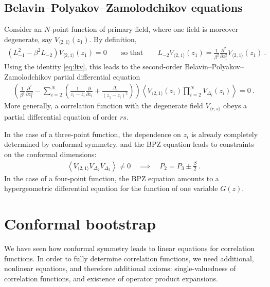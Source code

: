 \documentclass[12pt, a4paper]{article}
\theoremstyle{break}
\begin{document}
\subsection{Belavin--Polyakov--Zamolodchikov equations}

Consider an $N$-point function of primary field, where one field is moreover degenerate, say $V_{\langle 2, 1 \rangle}(z_1)$. By definition,
\begin{align}
\left(L_{-1}^2 - \beta^2 L_{-2}\right) V_{\langle 2, 1 \rangle}(z_1)  = 0\qquad \text{so that} \qquad L_{-2}V_{\langle 2, 1 \rangle}(z_1) = \frac{1}{\beta^2}\frac{\partial^2}{\partial z_1^2} V_{\langle 2, 1 \rangle}(z_1)\ .
\end{align}
Using the identity \eqref{eq:ltv},
this leads to the second-order Belavin--Polyakov--Zamolodchikov partial differential equation
\begin{align}
 \left( \frac{1}{\beta^2}\frac{\partial^2}{\partial z_1^2} - \sum_{i=2}^N\left(\frac{1}{z_1-z_i}\frac{\partial}{\partial z_i} +\frac{\Delta_i}{(z_1-z_i)^2}\right) \right)\left< V_{\langle 2, 1 \rangle}(z_1) \prod_{i=2}^N V_{\Delta_i}(z_i) \right>  = 0\ .
 \label{eq:bpz}
\end{align}
More generally, a correlation function with the degenerate field $V_{\langle r,s\rangle}$ obeys a partial differential equation of order $rs$. 

In the case of a three-point function, the dependence on $z_i$ is already completely determined by conformal symmetry, and the BPZ equation leads to constraints on the conformal dimensions:
\begin{align}
 \left< V_{\langle 2, 1 \rangle} V_{\Delta_2} V_{\Delta_3} \right> \neq 0 \quad \implies \quad 
 P_2 = P_3 \pm \frac{\beta}{2}\ .
 \label{eq:alpm}
\end{align}
In the case of a four-point function, the BPZ equation amounts to a hypergeometric differential equation for the function of one variable $G(z)$.


\section{Conformal bootstrap}

We have seen how conformal symmetry leads to linear equations for correlation functions.
In order to fully determine correlation functions, we need additional, nonlinear equations, and therefore additional axioms: single-valuedness of correlation functions, and existence of operator product expansions.  
\end{document}
